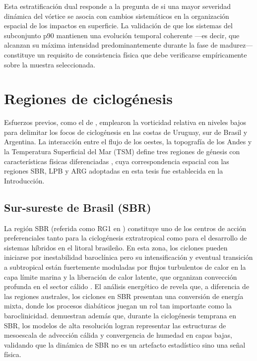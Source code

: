 Esta estratificación dual responde a la pregunta de si una mayor severidad dinámica del vórtice se asocia con cambios sistemáticos en la organización espacial de los impactos en superficie. La validación de que los sistemas del subconjunto p90 mantienen una evolución temporal coherente ---es decir, que alcanzan su máxima intensidad predominantemente durante la fase de madurez--- constituye un requisito de consistencia física que debe verificarse empíricamente sobre la muestra seleccionada.


\section{Regiones de ciclogénesis}\label{sec:tb_regiones}
%
Esfuerzos previos, como el de \citet{reboita2010south}, emplearon la vorticidad relativa en niveles bajos para delimitar los focos de ciclogénesis en las costas de Uruguay, sur de Brasil y Argentina. La interacción entre el flujo de los oestes, la topografía de los Andes y la Temperatura Superficial del Mar (TSM) define tres regiones de génesis con características físicas diferenciadas \citep{gramcianinov2019properties}, cuya correspondencia espacial con las regiones SBR, LPB y ARG adoptadas en esta tesis fue establecida en la Introducción.

\subsection{Sur-sureste de Brasil (SBR)}\label{subsec:tb_sbr}

La región SBR (referida como RG1 en \citet{reboita2022from}) constituye uno de los centros de acción preferenciales tanto para la ciclogénesis extratropical como para el desarrollo de sistemas híbridos en el litoral brasileño. En esta zona, los ciclones pueden iniciarse por inestabilidad baroclínica pero su intensificación y eventual transición a subtropical están 
fuertemente moduladas por flujos turbulentos de calor en la capa límite marina y la liberación de calor latente, que organizan convección profunda en el sector cálido \citep{reboita2022from}. El análisis energético de \citet{coutodesouza2024thesis} revela que, a diferencia de las regiones australes, los ciclones en SBR presentan una conversión de energía mixta, donde los procesos diabáticos juegan un rol tan importante como la baroclinicidad. \citet{gramcianinov2024early} demuestran además que, durante la ciclogénesis temprana en SBR, los modelos de alta resolución 
logran representar las estructuras de mesoescala de advección cálida y convergencia de humedad en capas bajas, validando que la dinámica de SBR no es un artefacto estadístico sino una señal física.

